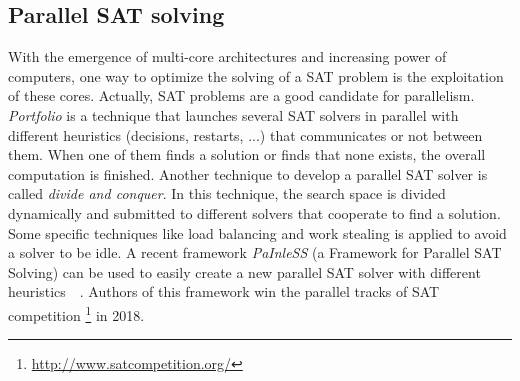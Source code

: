 \subsection{Parallel SAT solving}
With the emergence of multi-core architectures and increasing power of computers, one way to optimize the solving
of a SAT problem is the exploitation of these cores. Actually, SAT problems are a good candidate for parallelism.
\emph{Portfolio} is a technique that launches several SAT solvers in parallel with different heuristics (decisions, restarts, ...) that 
communicates or not between them. When one of them finds a solution or finds that none exists, the overall computation is finished.
Another technique to develop a parallel SAT solver is called \emph{divide and conquer}. In this technique,
the search space is divided  dynamically and submitted to different solvers that cooperate to find a solution.
 Some specific techniques like load balancing and work stealing is applied to avoid a solver to be idle.
A recent framework \emph{PaInleSS} (a Framework for Parallel SAT Solving) can be used to easily create a new parallel 
SAT solver with different heuristics~\cite{le2017painless}~\cite{le2019modular}. Authors of this framework win the parallel 
tracks of SAT competition \footnote{\url{http://www.satcompetition.org/}} in 2018.



%
